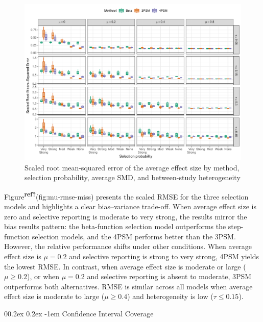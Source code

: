 \documentclass[
  american,
  man, donotrepeattitle,floatsintext]{apa7}
\makeatletter
\let\oldparagraph\paragraph
\renewcommand{\paragraph}{
    \@ifstar
      \xxxParagraphStar
      \xxxParagraphNoStar
  }
\newcommand{\xxxParagraphStar}[1]{\oldparagraph*{#1}\mbox{}}
\newcommand{\xxxParagraphNoStar}[1]{\oldparagraph{#1}\mbox{}}
\renewcommand{\paragraph}{\@startsection{paragraph}{4}{\parindent}%
  {0\baselineskip \@plus 0.2ex \@minus 0.2ex}%
  {-1em}%
  {\normalfont\normalsize\bfseries\itshape\typesectitle}}
\makeatother
\begin{document}
\begin{figure}
\includegraphics{beta-function-selection-models-with-dependent-effects_files/figure-latex/mu-rmse-main-miss-1} \caption{Scaled root mean-squared error of the average effect size by method, selection probability, average SMD, and between-study heterogeneity}\label{fig:mu-rmse-main-miss}
\end{figure}

Figure\textsuperscript{\textbf{ref?}}(fig:mu-rmse-miss) presents the scaled RMSE for the three selection models and highlights a clear bias--variance trade-off. When average effect size is zero and selective reporting is moderate to very strong, the results mirror the bias results pattern: the beta-function selection model outperforms the step-function selection models, and the 4PSM performs better than the 3PSM. However, the relative performance shifts under other conditions. When average effect size is \(\mu = 0.2\) and selective reporting is strong to very strong, 4PSM yields the lowest RMSE. In contrast, when average effect size is moderate or large (\(\mu \geq 0.2\)), or when \(\mu = 0.2\) and selective reporting is absent to moderate, 3PSM outperforms both alternatives. RMSE is similar across all models when average effect size is moderate to large (\(\mu \geq 0.4\)) and heterogeneity is low (\(\tau \leq 0.15\)).

\paragraph{Confidence Interval Coverage}\label{confidence-interval-coverage-1}
\end{document}
